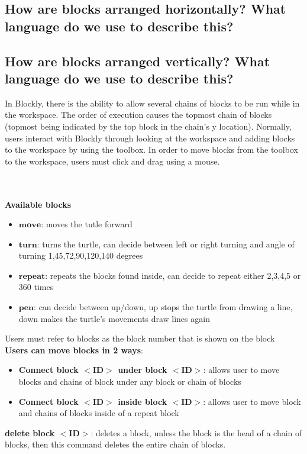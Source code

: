 \documentclass[]{article}
\begin{document}
\subsection{How are blocks arranged horizontally? What language do we use to describe this?}

\subsection{How are blocks arranged vertically? What language do we use to describe this?}


In Blockly, there is the ability to allow several chains of blocks to be run while
in the workspace. The order of execution causes the topmost chain of blocks (topmost 
being indicated by the top block in the chain's y location). Normally, users interact
with Blockly through looking at the workspace and adding blocks to the workspace by
using the toolbox. In order to move blocks from the toolbox to the workspace, users
must click and drag using a mouse. 


\\\\ \textbf{Available blocks}
\begin{itemize}
\item $\textbf{move}$: moves the tutle forward
\item $\textbf{turn}$: turns the turtle, can decide between left or right turning and angle of turning  1,45,72,90,120,140 degrees
\item $\textbf{repeat}$: repeats the blocks found inside, can decide to repeat either 2,3,4,5 or 360 times
\item $\textbf{pen}$: can decide between up/down, up stops the turtle from drawing a line, down makes the turtle's movements draw lines again
\end{itemize}


Users must refer to blocks as the block number that is shown on the block\\
\textbf{Users can move blocks in 2 ways}:
\begin{itemize}
\item \textbf{Connect block $<$ID$>$ under block $<$ID$>$}: allows user to move blocks and chains of block under any block or chain of blocks
\item \textbf{Connect block $<$ID$>$ inside block $<$ID$>$}: allows user to move block and chains of blocks inside of a repeat block
\end{itemize}
\textbf{delete block $<$ID$>$}: deletes a block,  unless the block is the head of a chain of blocks, then this command deletes the entire chain of blocks. 
\end{document}
